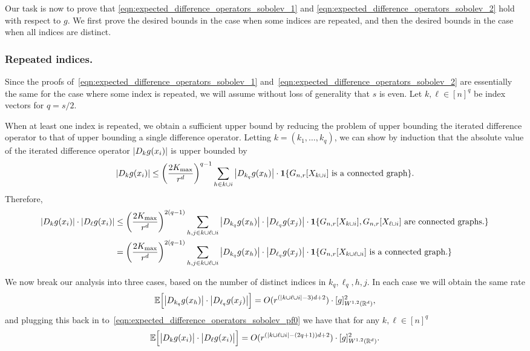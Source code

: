 \documentclass{article}
\newcommand{\Reals}{\mathbb{R}}
\newcommand{\1}{\mathbf{1}}
\newcommand{\Rd}{\Reals^d}
\newcommand{\Ebb}{\mathbb{E}}
\theoremstyle{alden}
\theoremstyle{aldenthm}
\theoremstyle{definition}
\theoremstyle{remark}
\begin{document}
Our task is now to prove that \eqref{eqn:expected_difference_operators_sobolev_1} and \eqref{eqn:expected_difference_operators_sobolev_2} hold with respect to $g$. We first prove the desired bounds in the case when some indices are repeated, and then the desired bounds in the case when all indices are distinct.

\subsubsection{Repeated indices.}

Since the proofs of~\eqref{eqn:expected_difference_operators_sobolev_1} and~\eqref{eqn:expected_difference_operators_sobolev_2} are essentially the same for the case where some index is repeated, we will assume without loss of generality that $s$ is even. Let $k,\ell \in [n]^q$ be index vectors for $q = s/2$. 

When at least one index is repeated, we obtain a sufficient upper bound by reducing the problem of upper bounding the iterated difference operator to that of upper bounding a single difference operator. Letting $k = (k_1,\ldots,k_q)$, we can show by induction that the absolute value of the iterated difference operator $\abs{D_kg(x_i)}$ is upper bounded by
\begin{equation*}
\abs{D_kg(x_i)} \leq \left(\frac{2K_{\max}}{r^d}\right)^{q-1} \sum_{h \in k \cup i} \abs{D_{k_q}g(x_h)} \cdot \1\{G_{n,r}[X_{k \cup i}]~\textrm{is a connected graph} \}.
\end{equation*}
Therefore,
\begin{align}
\abs{D_kg(x_i)} \cdot \abs{D_{\ell}g(x_i)} & \leq \left(\frac{2K_{\max}}{r^d}\right)^{2(q - 1)} \sum_{h,j \in k \cup \ell \cup i} \abs{D_{k_q}g(x_h)} \cdot \abs{D_{\ell_q}g(x_j)} \cdot \1\{G_{n,r}[X_{k \cup i}], G_{n,r}[X_{\ell \cup i}]~\textrm{are connected graphs.} \} \nonumber \\
& =  \left(\frac{2K_{\max}}{r^d}\right)^{2(q - 1)} \sum_{h,j \in k \cup \ell \cup i} \abs{D_{k_q}g(x_h)} \cdot \abs{D_{\ell_q}g(x_j)} \cdot \1\{G_{n,r}[X_{k \cup \ell \cup i}] ~\textrm{is a connected graph.} \} \label{eqn:expected_difference_operators_sobolev_pf0}
\end{align}

We now break our analysis into three cases, based on the number of distinct indices in $k_q,\ell_q,h,j$. In each case we will obtain the same rate
\begin{equation*}
\Ebb\Bigl[\abs{D_{k_q}g(x_h)} \cdot \abs{D_{\ell_q}g(x_j)}\Bigr] = O(r^{(\abs{k \cup \ell \cup i} - 3)d + 2}) \cdot [g]_{W^{1,2}(\Rd)}^2,
\end{equation*}
and plugging this back in to~\eqref{eqn:expected_difference_operators_sobolev_pf0} we have that for any $k, \ell \in [n]^q$
\begin{equation*}
\Ebb\Bigl[\bigl|D_{k}g(x_i)\bigr| \cdot \bigl|D_{\ell}g(x_i)\bigr|\Bigr] = O(r^{(\abs{k \cup \ell \cup i} - (2q + 1))d + 2}) \cdot [g]_{W^{1,2}(\Rd)}^2.
\end{equation*}
\end{document}
